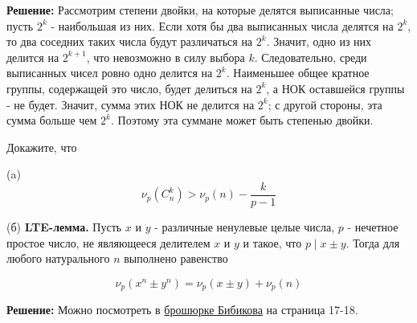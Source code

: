 \textbf{Решение:}
Рассмотрим степени двойки, на которые делятся выписанные числа; пусть $2^k$ - наибольшая из них. Если хотя бы два выписанных числа делятся на $2^k$, то два соседних таких числа будут различаться на $2^k$. Значит, одно из них делится на $2^{k+1}$, что невозможно в силу выбора $k$. Следовательно, среди выписанных чисел ровно одно делится на $2^k$.
Наименьшее общее кратное группы, содержащей это число, будет делиться на $2^k$, а НОК оставшейся группы - не будет. Значит, сумма этих НОК не делится на $2^k$; с другой стороны, эта сумма больше чем $2^k$. Поэтому эта суммане может быть степенью двойки.


Докажите, что

(a)
$$
\nu_p(C_n^k)>\nu_p(n)-\frac{k}{p-1}
$$

(б)
\textbf{LTE-лемма.} Пусть $x$ и $y$ - различные ненулевые целые числа, $p$ - нечетное простое число, не являющееся делителем $x$ и $y$ и такое, что $p \mid x \pm y$. Тогда для любого натурального $n$ выполнено равенство

$$
\nu_p(x^n \pm y^n) = \nu_p(x \pm y)+\nu_p (n)
$$

\textbf{Решение:} Можно посмотреть в \href{https://math.mosolymp.ru/upload/files/method/2019/Bibikov-LTE.pdf}{брошюрке Бибикова} на страница 17-18.